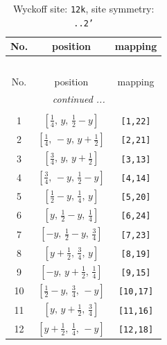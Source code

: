 \documentclass[fleqn,8pt]{jsarticle}
\begin{document}
\begin{longtable}{ccc}
\caption{Wyckoff site: {\tt 12k}, site symmetry: {\tt ..2'}}
 \\
 \hline \hline
No. & position & mapping \\ \hline \endfirsthead

\multicolumn{2}{l}{\tablename\ \thetable{}} \\
 \hline \hline
No. & position & mapping \\ \hline \endhead

 \hline \hline
\multicolumn{2}{r}{\footnotesize\it continued ...} \\ \endfoot

 \hline \hline
\multicolumn{2}{r}{} \\ \endlastfoot

1 & $\left[ \frac{1}{4},\, y,\, \frac{1}{2} - y \right]$ & {\tt [1,22]} \\ \hline
2 & $\left[ \frac{1}{4},\, - y,\, y + \frac{1}{2} \right]$ & {\tt [2,21]} \\ \hline
3 & $\left[ \frac{3}{4},\, y,\, y + \frac{1}{2} \right]$ & {\tt [3,13]} \\ \hline
4 & $\left[ \frac{3}{4},\, - y,\, \frac{1}{2} - y \right]$ & {\tt [4,14]} \\ \hline
5 & $\left[ \frac{1}{2} - y,\, \frac{1}{4},\, y \right]$ & {\tt [5,20]} \\ \hline
6 & $\left[ y,\, \frac{1}{2} - y,\, \frac{1}{4} \right]$ & {\tt [6,24]} \\ \hline
7 & $\left[ - y,\, \frac{1}{2} - y,\, \frac{3}{4} \right]$ & {\tt [7,23]} \\ \hline
8 & $\left[ y + \frac{1}{2},\, \frac{3}{4},\, y \right]$ & {\tt [8,19]} \\ \hline
9 & $\left[ - y,\, y + \frac{1}{2},\, \frac{1}{4} \right]$ & {\tt [9,15]} \\ \hline
10 & $\left[ \frac{1}{2} - y,\, \frac{3}{4},\, - y \right]$ & {\tt [10,17]} \\ \hline
11 & $\left[ y,\, y + \frac{1}{2},\, \frac{3}{4} \right]$ & {\tt [11,16]} \\ \hline
12 & $\left[ y + \frac{1}{2},\, \frac{1}{4},\, - y \right]$ & {\tt [12,18]} \\
\end{longtable}
\renewcommand{\arraystretch}{1.2}
\end{document}
